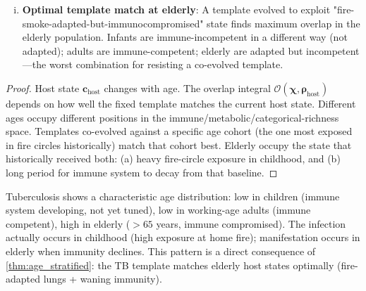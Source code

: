 \documentclass[11pt,twocolumn,a4paper]{article}
\newcommand{\Template}{\boldsymbol{\chi}}
\newcommand{\State}{\boldsymbol{\rho}}
\newcommand{\Overlap}{\mathcal{O}}
\begin{document}
\begin{theorem}
\begin{enumerate}[(i)]
\item \textbf{Optimal template match at elderly}: A template evolved to exploit "fire-smoke-adapted-but-immunocompromised" state finds maximum overlap in the elderly population. Infants are immune-incompetent in a different way (not adapted); adults are immune-competent; elderly are adapted but incompetent—the worst combination for resisting a co-evolved template.
\end{enumerate}
\end{theorem}

\begin{proof}
Host state $\mathbf{c}_{\mathrm{host}}$ changes with age. The overlap integral $\Overlap(\Template, \State_{\mathrm{host}})$ depends on how well the fixed template matches the current host state. Different ages occupy different positions in the immune/metabolic/categorical-richness space. Templates co-evolved against a specific age cohort (the one most exposed in fire circles historically) match that cohort best. Elderly occupy the state that historically received both: (a) heavy fire-circle exposure in childhood, and (b) long period for immune system to decay from that baseline.
\end{proof}

\begin{example}
Tuberculosis shows a characteristic age distribution: low in children (immune system developing, not yet tuned), low in working-age adults (immune competent), high in elderly ($>65$ years, immune compromised). The infection actually occurs in childhood (high exposure at home fire); manifestation occurs in elderly when immunity declines. This pattern is a direct consequence of \cref{thm:age_stratified}: the TB template matches elderly host states optimally (fire-adapted lungs + waning immunity).
\end{example}
\end{document}
